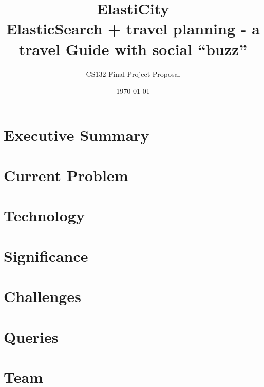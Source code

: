\documentclass{sty/acm_proc_article-sp}
\begin{document}
\title{ElastiCity \\\vspace{10pt} \large ElasticSearch + travel planning - a travel Guide with social ``buzz''}
\subtitle{CS132 Final Project Proposal}

\author{}

\date{\today}


\maketitle
\section{Executive Summary}
\newpage
\section{Current Problem}

\section{Technology}

\section{Significance}

\section{Challenges}

\section{Queries}


\section{Team}
\end{document}
